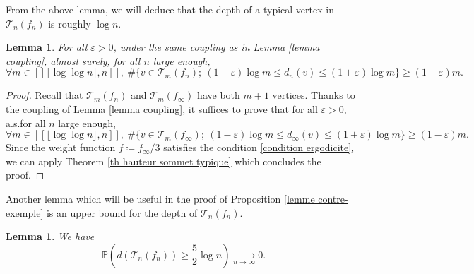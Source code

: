 \documentclass[11pt]{article}
\newtheorem{lemma}[theorem]{Lemma}
\numberwithin{equation}{section}
\def\vp{\varepsilon}
\def \T{\mathcal{T}}
\def\P{\mathbb{P}}
\def\lb{[\![}
\def\rb{]\!]}
\begin{document}
From the above lemma, we will deduce that the depth of a typical vertex in $\T_n(f_n)$ is roughly $\log n$.
\begin{lemma}\label{lemme hauteur sommet typique}
	For all $\vp>0$, under the same coupling as in Lemma \ref{lemma coupling}, almost surely, for all $n$ large enough,
	\[
	\forall m \in \lb \lfloor \log \log n \rfloor , n \rb , \ \#\{ v \in \T_m(f_n);  \ (1-\vp) \log m \le  d_n(v) \le (1+\vp) \log m \} \ge (1-\vp) m  .
	\]
\end{lemma}
\begin{proof}
	Recall that $\T_m(f_n)$ and $\T_m(f_\infty)$ have both $m+1$ vertices. Thanks to the coupling of Lemma \ref{lemma coupling}, it suffices to prove that for all $\vp>0$, a.s.\@ for all $n$ large enough,
	\[
	\forall m \in \lb \lfloor \log \log n \rfloor , n \rb , \ \#\{ v \in \T_m(f_\infty);  \ (1-\vp) \log m \le  d_\infty(v) \le (1+\vp) \log m \} \ge (1-\vp) m.
	\]
	Since the weight function $f\coloneqq f_\infty/3$ satisfies the condition \eqref{condition ergodicite}, we can apply Theorem \ref{th hauteur sommet typique} which concludes the proof.
\end{proof}
Another lemma which will be useful in the proof of Proposition \ref{lemme contre-exemple} is an upper bound for the depth of $\T_n(f_n)$.
\begin{lemma}\label{lemme hauteur au plus cinq demi}
	We have
	\[
	\P\left( d(\T_n(f_n)) \ge \frac{5}{2} \log n 
	 \right)
	 \mathop{\longrightarrow}\limits_{n\to \infty} 0.
	\]
\end{lemma}
\end{document}
